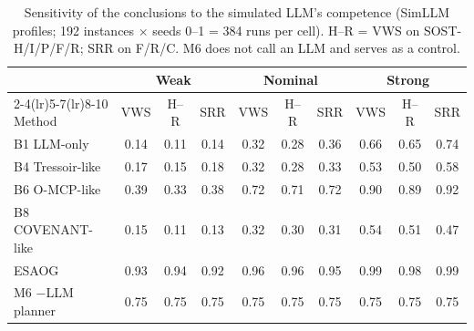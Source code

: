 \begin{table}[H]
\centering
\caption{Sensitivity of the conclusions to the simulated LLM's competence (SimLLM profiles; 192 instances $\times$ seeds 0--1 = 384 runs per cell). H--R = VWS on SOST-H/I/P/F/R; SRR on F/R/C. M6 does not call an LLM and serves as a control.}
\label{tab:sensitivity}
\scriptsize
\begin{tabular}{lccccccccc}
\toprule
& \multicolumn{3}{c}{Weak} & \multicolumn{3}{c}{Nominal} & \multicolumn{3}{c}{Strong}\\
\cmidrule(lr){2-4}\cmidrule(lr){5-7}\cmidrule(lr){8-10}
Method & VWS & H--R & SRR & VWS & H--R & SRR & VWS & H--R & SRR\\
\midrule
B1 LLM-only & 0.14 & 0.11 & 0.14 & 0.32 & 0.28 & 0.36 & 0.66 & 0.65 & 0.74\\
B4 Tressoir-like & 0.17 & 0.15 & 0.18 & 0.32 & 0.28 & 0.33 & 0.53 & 0.50 & 0.58\\
B6 O-MCP-like & 0.39 & 0.33 & 0.38 & 0.72 & 0.71 & 0.72 & 0.90 & 0.89 & 0.92\\
B8 COVENANT-like & 0.15 & 0.11 & 0.13 & 0.32 & 0.30 & 0.31 & 0.54 & 0.51 & 0.47\\
ESAOG & 0.93 & 0.94 & 0.92 & 0.96 & 0.96 & 0.95 & 0.99 & 0.98 & 0.99\\
M6 $-$LLM planner & 0.75 & 0.75 & 0.75 & 0.75 & 0.75 & 0.75 & 0.75 & 0.75 & 0.75\\
\bottomrule
\end{tabular}
\end{table}
